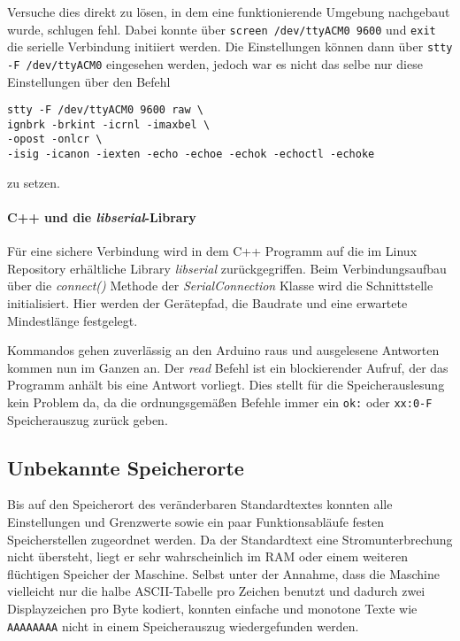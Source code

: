 Versuche dies direkt zu lösen, in dem eine funktionierende Umgebung nachgebaut wurde, schlugen fehl.
Dabei konnte über \texttt{screen /dev/ttyACM0 9600} und \texttt{exit} die serielle Verbindung initiiert werden.
Die Einstellungen können dann über \texttt{stty -F /dev/ttyACM0} eingesehen werden, jedoch war es nicht das selbe nur diese Einstellungen über den Befehl
\begin{lstlisting}[label=lst:stty,caption={stty zum setzen der Verbindungseinstellungen}]
stty -F /dev/ttyACM0 9600 raw \
ignbrk -brkint -icrnl -imaxbel \
-opost -onlcr \
-isig -icanon -iexten -echo -echoe -echok -echoctl -echoke
\end{lstlisting}
zu setzen.

\paragraph{C++ und die \textit{libserial}-Library}
Für eine sichere Verbindung wird in dem C++ Programm auf die im Linux Repository erhältliche Library \textit{libserial} zurückgegriffen.
Beim Verbindungsaufbau über die \textit{connect()} Methode der \textit{SerialConnection} Klasse wird die Schnittstelle initialisiert.
Hier werden der Gerätepfad, die Baudrate und eine erwartete Mindestlänge festgelegt.

Kommandos gehen zuverlässig an den Arduino raus und ausgelesene Antworten kommen nun im Ganzen an.
Der \textit{read} Befehl ist ein blockierender Aufruf, der das Programm anhält bis eine Antwort vorliegt.
Dies stellt für die Speicherauslesung kein Problem da, da die ordnungsgemäßen Befehle immer ein \texttt{ok:} oder \texttt{xx:0-F} Speicherauszug zurück geben.

\subsection{Unbekannte Speicherorte}\label{subsec:UnbekannteSpeicherorte}
Bis auf den Speicherort des veränderbaren Standardtextes konnten alle Einstellungen und Grenzwerte sowie ein paar Funktionsabläufe festen Speicherstellen zugeordnet werden.
Da der Standardtext eine Stromunterbrechung nicht übersteht, liegt er sehr wahrscheinlich im \ac{RAM} oder einem weiteren flüchtigen Speicher der Maschine.
Selbst unter der Annahme, dass die Maschine vielleicht nur die halbe \ac{ASCII}-Tabelle pro Zeichen benutzt und dadurch zwei Displayzeichen pro Byte kodiert, konnten einfache und monotone Texte wie \texttt{AAAAAAAA} nicht in einem Speicherauszug wiedergefunden werden.

